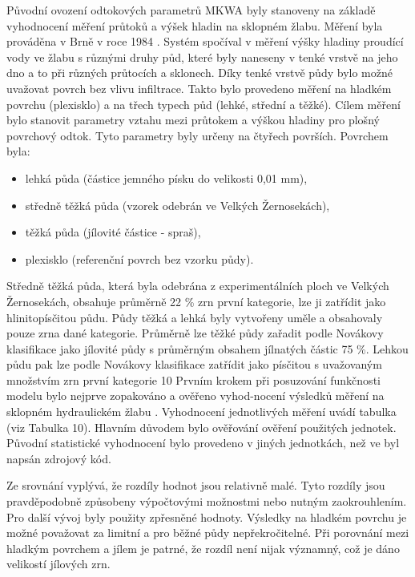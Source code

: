 Původní ovození odtokových parametrů MKWA byly stanoveny na základě vyhodnocení měření průtoků a výšek hladin na sklopném žlabu. Měření byla prováděna v Brně v roce 1984 \cite{Holy1984}. Systém spočíval v měření výšky hladiny proudící vody ve žlabu s různými druhy půd, které byly naneseny v tenké vrstvě na jeho dno a to při různých průtocích a sklonech. Díky tenké vrstvě půdy bylo možné uvažovat povrch bez vlivu infiltrace. Takto bylo provedeno měření na hladkém povrchu (plexisklo) a na třech typech půd (lehké, střední a těžké). Cílem měření bylo stanovit parametry vztahu mezi průtokem a výškou hladiny pro plošný povrchový odtok.
Tyto parametry byly určeny na čtyřech površích. Povrchem byla:

\begin{itemize}
\item lehká půda (částice jemného písku do velikosti 0,01 mm),
\item středně těžká půda (vzorek odebrán ve Velkých Žernosekách),
\item těžká půda (jílovité částice - spraš),
\item plexisklo (referenční povrch bez vzorku půdy).
\end{itemize}

Středně těžká půda, která byla odebrána z experimentálních ploch ve Velkých Žernosekách, obsahuje průměrně 22 \% zrn první kategorie, lze ji zatřídit jako hlinitopísčitou půdu. Půdy těžká a lehká byly vytvořeny uměle a obsahovaly pouze zrna dané kategorie. Průměrně lze těžké půdy zařadit podle Novákovy klasifikace jako jílovité půdy s průměrným obsahem jílnatých částic 75 \%. Lehkou půdu pak lze podle Novákovy klasifikace zatřídit jako písčitou s uvažovaným množstvím zrn první kategorie 10 %
Prvním krokem při posuzování funkčnosti modelu bylo nejprve zopakováno a ověřeno vyhod-nocení výsledků měření na sklopném hydraulickém žlabu \cite{Holy1984}. Vyhodnocení jednotlivých měření uvádí tabulka (viz Tabulka 10).
Hlavním důvodem bylo ověřování ověření použitých jednotek. Původní statistické vyhodnocení bylo provedeno v jiných jednotkách, než ve byl napsán zdrojový kód.



Ze srovnání vyplývá, že rozdíly hodnot jsou relativně malé. Tyto rozdíly jsou pravděpodobně způsobeny výpočtovými možnostmi nebo nutným zaokrouhlením. Pro další vývoj byly použity zpřesněné hodnoty.
Výsledky na hladkém povrchu je možné považovat za limitní a pro běžné půdy nepřekročitelné. Při porovnání mezi hladkým povrchem a jílem je patrné, že rozdíl není nijak významný, což je dáno velikostí jílových zrn.


